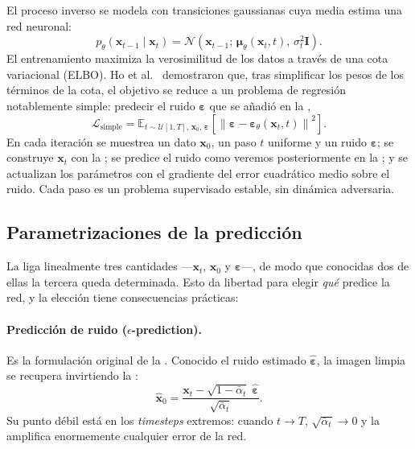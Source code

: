 El proceso inverso se modela con transiciones gaussianas cuya media
estima una red neuronal:
\begin{equation}
    p_\theta(\mathbf{x}_{t-1} \mid \mathbf{x}_t)
    = \mathcal{N}\!\left(\mathbf{x}_{t-1};\,
      \boldsymbol{\mu}_\theta(\mathbf{x}_t, t),\,
      \sigma_t^2 \mathbf{I}\right).
    \label{eq:reverse-step}
\end{equation}
El entrenamiento maximiza la verosimilitud de los datos a través de
una cota variacional (ELBO). Ho et al.~\cite{ho2020ddpm} demostraron que, 
tras simplificar los pesos de los términos de la cota, el objetivo se 
reduce a un problema de regresión notablemente simple: predecir el ruido
$\boldsymbol{\varepsilon}$ que se añadió en la
,
\begin{equation}
    \mathcal{L}_{\text{simple}}
    = \mathbb{E}_{t \sim \mathcal{U}[1,T],\, \mathbf{x}_0,\,
                   \boldsymbol{\varepsilon}}
      \!\left[\left\|\boldsymbol{\varepsilon}
        - \boldsymbol{\varepsilon}_\theta\!\left(\mathbf{x}_t, t\right)
        \right\|^2\right].
    \label{eq:loss-eps}
\end{equation}
En cada iteración se muestrea un dato $\mathbf{x}_0$, un paso $t$
uniforme y un ruido $\boldsymbol{\varepsilon}$; se construye
$\mathbf{x}_t$ con la ; se predice el ruido como
veremos posteriormente en la ; y se actualizan los
parámetros con el gradiente del error cuadrático medio sobre el ruido. Cada paso es
un problema supervisado estable, sin dinámica adversaria.

\subsection{Parametrizaciones de la predicción}
\label{subsec:parametrizaciones}

La  liga linealmente tres cantidades
—$\mathbf{x}_t$, $\mathbf{x}_0$ y $\boldsymbol{\varepsilon}$—, de
modo que conocidas dos de ellas la tercera queda determinada. Esto da
libertad para elegir \emph{qué} predice la red, y la elección tiene
consecuencias prácticas:

\paragraph{Predicción de ruido ($\epsilon$-prediction).}
Es la formulación original de la . Conocido el
ruido estimado $\hat{\boldsymbol{\varepsilon}}$, la imagen limpia se
recupera invirtiendo la :
\begin{equation}
    \hat{\mathbf{x}}_0
    = \frac{\mathbf{x}_t
        - \sqrt{1-\bar{\alpha}_t}\;\hat{\boldsymbol{\varepsilon}}}
      {\sqrt{\bar{\alpha}_t}}.
    \label{eq:x0-from-eps}
\end{equation}
Su punto débil está en los \textit{timesteps} extremos: cuando
$t \to T$, $\sqrt{\bar{\alpha}_t} \to 0$ y la
 amplifica enormemente cualquier error de la
red.

